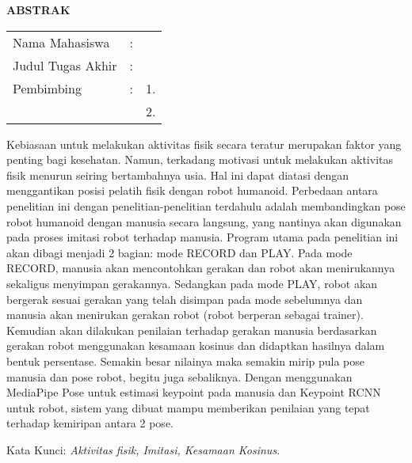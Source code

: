 \begin{center}
  \large\textbf{ABSTRAK}
\end{center}


\vspace{2ex}

\begingroup
\setlength{\tabcolsep}{0pt}

\noindent
\begin{tabularx}{\textwidth}{l >{\centering}m{2em} X}
  Nama Mahasiswa    & : & \name{}         \\

  Judul Tugas Akhir & : & \tatitle{}      \\

  Pembimbing        & : & 1. \advisor{}   \\
                    &   & 2. \coadvisor{} \\
\end{tabularx}
\endgroup

Kebiasaan untuk melakukan aktivitas fisik secara teratur merupakan faktor yang penting bagi kesehatan. 
Namun, terkadang motivasi untuk melakukan aktivitas fisik menurun seiring bertambahnya usia.
Hal ini dapat diatasi dengan menggantikan posisi pelatih fisik dengan robot humanoid. 
Perbedaan antara penelitian ini dengan penelitian-penelitian terdahulu adalah membandingkan pose robot humanoid dengan manusia secara langsung, 
yang nantinya akan digunakan pada proses imitasi robot terhadap manusia. 
Program utama pada penelitian ini akan dibagi menjadi 2 bagian: mode RECORD dan PLAY. Pada mode RECORD, manusia akan mencontohkan gerakan dan robot akan menirukannya
sekaligus menyimpan gerakannya. Sedangkan pada mode PLAY, robot akan bergerak sesuai gerakan yang telah disimpan pada mode sebelumnya dan manusia akan menirukan gerakan robot (robot berperan sebagai trainer).
Kemudian akan dilakukan penilaian terhadap gerakan manusia berdasarkan gerakan robot menggunakan kesamaan kosinus dan didaptkan hasilnya dalam bentuk persentase.
Semakin besar nilainya maka semakin mirip pula pose manusia dan pose robot, begitu juga sebaliknya.
Dengan menggunakan MediaPipe Pose untuk estimasi keypoint pada manusia dan Keypoint RCNN untuk robot, sistem yang dibuat mampu memberikan penilaian yang tepat terhadap kemiripan antara 2 pose.

Kata Kunci: \emph{Aktivitas fisik, Imitasi, Kesamaan Kosinus}.
